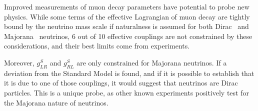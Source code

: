 
Improved measurements of muon decay parameters have potential to probe new physics.  While some terms of the effective Lagrangian of muon decay are tightly bound by the neutrino mass scale if naturalness is assumed for both Dirac~\cite{erwin:2006}
and Majorana~\cite{erwin:2007}
neutrinos, 6 out of 10 effective couplings are not constrained by these considerations, and their best limits come from experiments.

Moreover, $g^{S}_{LR}$ and $g^{S}_{RL}$ are only constrained for Majorana neutrinos.  If a deviation from the Standard Model is found, and if it is possible to establish that it is due to one of those couplings, it would suggest that neutrinos are Dirac particles.  This is a unique probe, as other known experiments positively test for the Majorana nature of neutrinos.

